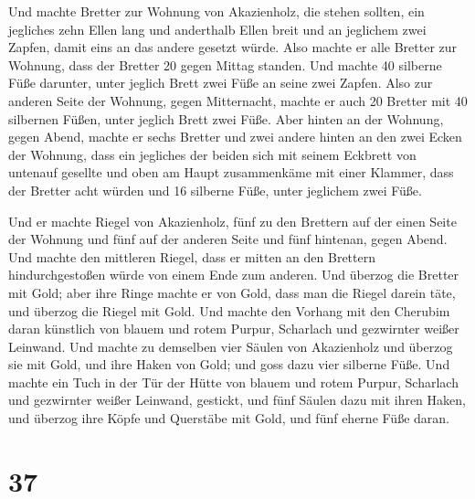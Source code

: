  Und machte Bretter zur Wohnung von Akazienholz, die
stehen sollten,  ein jegliches zehn Ellen lang und
anderthalb Ellen breit  und an jeglichem zwei Zapfen,
damit eins an das andere gesetzt würde. Also machte er alle Bretter zur
Wohnung,  dass der Bretter 20 gegen Mittag standen.
 Und machte 40 silberne Füße darunter, unter jeglich
Brett zwei Füße an seine zwei Zapfen.  Also zur anderen
Seite der Wohnung, gegen Mitternacht, machte er auch 20 Bretter
 mit 40 silbernen Füßen, unter jeglich Brett zwei Füße.
 Aber hinten an der Wohnung, gegen Abend, machte er sechs
Bretter  und zwei andere hinten an den zwei Ecken der
Wohnung,  dass ein jegliches der beiden sich mit seinem
Eckbrett von untenauf gesellte und oben am Haupt zusammenkäme mit einer
Klammer,  dass der Bretter acht würden und 16 silberne
Füße, unter jeglichem zwei Füße.

 Und er machte Riegel von Akazienholz, fünf zu den
Brettern auf der einen Seite der Wohnung  und fünf auf
der anderen Seite und fünf hintenan, gegen Abend.  Und
machte den mittleren Riegel, dass er mitten an den Brettern
hindurchgestoßen würde von einem Ende zum anderen.  Und
überzog die Bretter mit Gold; aber ihre Ringe machte er von Gold, dass
man die Riegel darein täte, und überzog die Riegel mit Gold.
 Und machte den Vorhang mit den Cherubim daran künstlich
von blauem und rotem Purpur, Scharlach und gezwirnter weißer Leinwand.
 Und machte zu demselben vier Säulen von Akazienholz und
überzog sie mit Gold, und ihre Haken von Gold; und goss dazu vier
silberne Füße.  Und machte ein Tuch in der Tür der Hütte
von blauem und rotem Purpur, Scharlach und gezwirnter weißer Leinwand,
gestickt,  und fünf Säulen dazu mit ihren Haken, und
überzog ihre Köpfe und Querstäbe mit Gold, und fünf eherne Füße daran.

\hypertarget{section-36}{%
\section{37}\label{section-36}}

